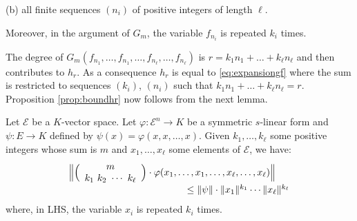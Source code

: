 \documentclass{sig-alternate}
\begin{document}
\noindent
(b) all finite sequences $(n_i)$ of positive integers of length
$\ell$.

\noindent
Moreover, in the argument of $G_m$, the variable $f_{n_i}$ 
is repeated $k_i$ times.

The degree of $G_m(f_{n_1}, \ldots, f_{n_1}, \ldots, f_{n_\ell},
\ldots, f_{n_\ell})$ is $r = k_1 n_1 + \ldots + k_\ell n_\ell$ and 
then contributes to $h_r$. As a consequence $h_r$ is equal to 
\eqref{eq:expansiongf} where the sum is restricted to sequences
$(k_i)$, $(n_i)$ such that $k_1 n_1 + \ldots + k_\ell n_\ell = r$.
Proposition \ref{prop:boundhr} now follows from the next lemma.

\begin{lem}
Let $\mathcal E$ be a $K$-vector space. Let $\varphi : \mathcal E^n \to 
K$ be a symmetric $s$-linear form and $\psi: E \to K$ defined by 
$\psi(x) = \varphi(x, x, \ldots, x)$.
Given $k_1, \ldots, k_\ell$ some positive integers whose sum is $m$ and 
$x_1, \ldots, x_\ell$ some elements of $\mathcal E$, we have:
$$\begin{array}{l}
\Big\Vert \binom m {k_1 \,\, k_2 \,\, \cdots \,\, k_\ell} \cdot
\varphi(x_1, \ldots, x_1, \ldots, x_\ell, \ldots,
x_\ell) \Big\Vert  \\
\hspace{4.3cm} \leq \Vert \psi \Vert \cdot \Vert x_1 \Vert^{k_1} \cdots
 \Vert x_\ell \Vert^{k_\ell}
\end{array}$$
where, in LHS, the variable $x_i$ is repeated $k_i$ times.
\end{lem}
\end{document}
